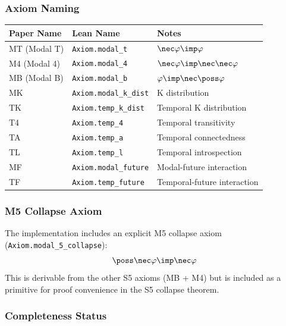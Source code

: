 \documentclass[../BimodalReference.tex]{subfiles}
\begin{document}
\subsubsection{Axiom Naming}

\begin{center}
\begin{tabular}{@{}lll@{}}
\toprule
Paper Name & Lean Name & Notes \\
\midrule
MT (Modal T) & \texttt{Axiom.modal\_t} & $\nec\varphi \imp \varphi$ \\
M4 (Modal 4) & \texttt{Axiom.modal\_4} & $\nec\varphi \imp \nec\nec\varphi$ \\
MB (Modal B) & \texttt{Axiom.modal\_b} & $\varphi \imp \nec\poss\varphi$ \\
MK & \texttt{Axiom.modal\_k\_dist} & K distribution \\
TK & \texttt{Axiom.temp\_k\_dist} & Temporal K distribution \\
T4 & \texttt{Axiom.temp\_4} & Temporal transitivity \\
TA & \texttt{Axiom.temp\_a} & Temporal connectedness \\
TL & \texttt{Axiom.temp\_l} & Temporal introspection \\
MF & \texttt{Axiom.modal\_future} & Modal-future interaction \\
TF & \texttt{Axiom.temp\_future} & Temporal-future interaction \\
\bottomrule
\end{tabular}
\end{center}

\subsubsection{M5 Collapse Axiom}

The implementation includes an explicit M5 collapse axiom (\texttt{Axiom.modal\_5\_collapse}):
\[
\poss\nec\varphi \imp \nec\varphi
\]
This is derivable from the other S5 axioms (MB + M4) but is included as a primitive
for proof convenience in the S5 collapse theorem.

\subsubsection{Completeness Status}
\end{document}
